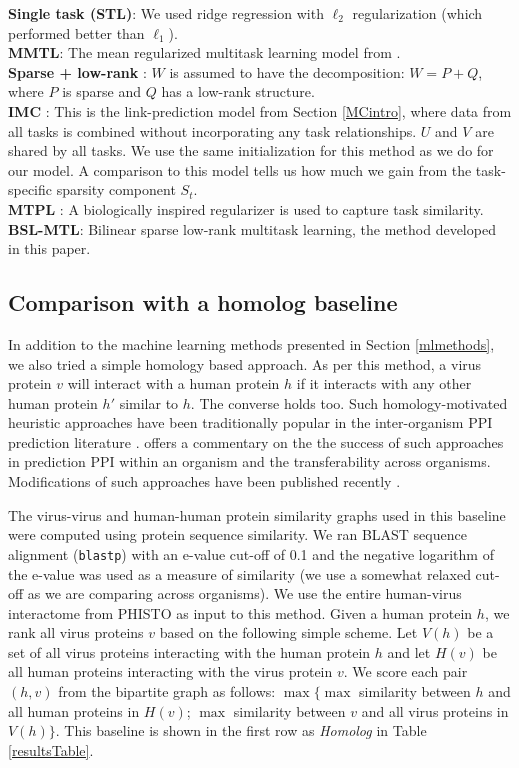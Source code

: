 \documentclass{bioinfo}
\begin{document}
\noindent\textbf{Single task (STL)}: We used ridge regression with $\ell_2$ regularization (which performed better than $\ell_1$). \\
\noindent\textbf{MMTL}: The mean regularized multitask learning model from \cite{pontil04}. \\
\noindent\textbf{Sparse + low-rank} \citep{chen2012}: $W$ is assumed to have the decomposition: $W = P + Q$, where $P$ is sparse and $Q$ has a low-rank structure. \\
\noindent\textbf{IMC} \citep{prateek,nagarajan}: This is the link-prediction model from Section \ref{MCintro}, where data from all tasks is combined without incorporating any task relationships. $U$ and $V$ are shared by all tasks. We use the same initialization for this method as we do for our model. A comparison to this model tells us how much we gain from the task-specific sparsity component $S_t$. \\
\noindent\textbf{MTPL} \citep{me_ismb_2013}: A biologically inspired regularizer is used to capture task similarity.\\ \noindent\textbf{BSL-MTL}: Bilinear sparse low-rank multitask learning, the method developed in this paper.



\subsection{Comparison with a homolog baseline}
In addition to the machine learning methods presented in Section \ref{mlmethods}, we also tried a simple homology based approach.
As per this method, a virus protein $v$ will interact with a human protein $h$ if it interacts with any other human protein $h'$ similar to $h$. The converse holds too. Such homology-motivated heuristic approaches have been traditionally popular in the inter-organism PPI prediction literature \citep{vidal:2001,matthews:2001}. \cite{mika:2006} offers a commentary on the the success of such approaches in prediction PPI within an organism and the transferability across organisms. Modifications of such approaches have been published recently \citep{chen:2009,lin:2013,murakami:2014}.

The virus-virus and human-human protein similarity graphs used in this baseline were computed using protein sequence similarity.
We ran BLAST sequence alignment (\texttt{blastp}) with an e-value cut-off of 0.1 and the negative logarithm of the e-value was used as a measure of similarity (we use a somewhat relaxed cut-off as we are comparing across organisms).
We use the entire human-virus interactome from PHISTO as input to this method. Given a human protein $h$, we rank all virus proteins $v$ based on the following simple scheme. Let $V(h)$ be a set of all virus proteins interacting with the human protein $h$ and let $H(v)$ be all human proteins interacting with the virus protein $v$. We score each pair $(h, v)$ from the bipartite graph as follows: $\max \{ \max $ similarity between $h$ and all human proteins in $H(v)$; $\max $ similarity between $v$ and all virus proteins in $V(h) \}$. 
This baseline is shown in the first row as \textit{Homolog} in Table \ref{resultsTable}.
\end{document}
